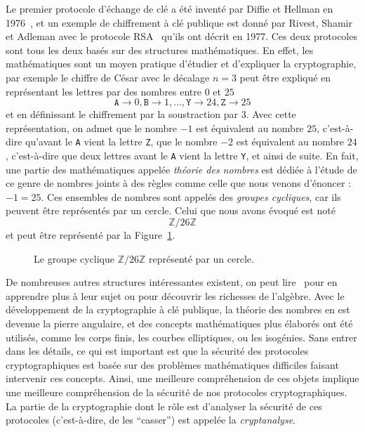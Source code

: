 Le premier protocole d'échange de clé a été inventé par Diffie et Hellman en
1976~\cite{DH76}, et un exemple de chiffrement à clé publique est donné par
Rivest, Shamir et Adleman avec le protocole RSA~\cite{RSA78} qu'ils ont décrit en
1977. Ces deux protocoles sont tous les deux basés sur des structures
mathématiques. En effet, les mathématiques sont un moyen pratique d'étudier et
d'expliquer la cryptographie, par exemple le chiffre de César avec le décalage
$n=3$
peut être expliqué en représentant les lettres par des nombres entre $0$ et $25$
\[
  \texttt{A}\to 0, \texttt{B} \to 1, \dots,\texttt{Y}\to24, \texttt{Z}\to25
\]
et en définissant le chiffrement par la soustraction par $3$. Avec cette
représentation, on admet que le nombre $-1$ est équivalent au nombre
$25$, c'est-à-dire qu'avant le \texttt{A} vient la lettre \texttt{Z}, que le
nombre $-2$ est équivalent au nombre $24$, c'est-à-dire que deux lettres avant
le \texttt{A} vient la lettre \texttt{Y}, et ainsi de suite. En fait, une partie
des mathématiques appelée \emph{théorie des nombres} est dédiée à l'étude de ce
genre de nombres joints à des règles comme celle que nous venons d'énoncer :
$-1=25$. Ces ensembles de nombres sont appelés des \emph{groupes cycliques}, car
ils peuvent être représentés par un cercle. Celui que nous avons évoqué est noté
\[
  \mathbb{Z}/26\mathbb{Z}
\]
et peut être représenté par la Figure~\ref{fig:cyclic-group}.
\begin{figure}[h]
  \centering
  \caption{Le groupe cyclique $\mathbb{Z}/26\mathbb{Z}$ représenté par un
cercle.}
  \label{fig:cyclic-group}
\end{figure}
De nombreuses autres structures intéressantes existent, on peut
lire~\cite{Lang04, Perrin96} pour en apprendre plus à leur sujet ou pour
découvrir les richesses de l'algèbre. Avec le développement de la cryptographie
à clé publique, la théorie des nombres en est devenue la pierre angulaire, et
des concepts mathématiques plus élaborés ont été utilisés, comme les corps
finis, les courbes elliptiques, ou les isogénies. Sans entrer dans les détails,
ce qui est important est que la sécurité des protocoles cryptographiques est
basée sur des problèmes mathématiques difficiles faisant intervenir ces
concepts. Ainsi, une meilleure compréhension de ces objets implique une
meilleure compréhension de la sécurité de nos protocoles cryptographiques. La
partie de la cryptographie dont le rôle est d'analyser la sécurité de ces
protocoles (c'est-à-dire, de les ``casser'') est appelée la \emph{cryptanalyse}.

